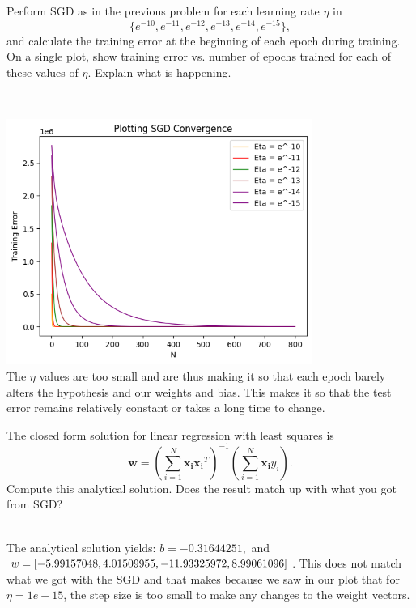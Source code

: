 \begin{problem}[2]
  Perform SGD as in the previous problem for each learning rate $\eta$ in \[\{e^{-10}, e^{-11}, e^{-12}, e^{-13}, e^{-14}, e^{-15}\},\] and calculate the training error at the beginning of each epoch during training.  On a single plot, show training error vs. number of epochs trained for each of these values of $\eta$. Explain what is happening.
\end{problem}
\begin{solution}
  \\
  \graphicspath{{images/}}
  \includegraphics[width=10cm]{Problem_3_H.png}
  \\
  The $\eta$ values are too small and are thus making it so that each epoch barely alters the hypothesis and our weights and bias. This makes it so that the test error remains relatively constant or takes a long time to change.
\end{solution}


\begin{problem}[2]
  The closed form solution for linear regression with least squares is \[\mathbf{w} = \left(\sum_{i=1}^N \mathbf{x_i}\mathbf{x_i}^T\right)^{-1}\left(\sum_{i=1}^N \mathbf{x_i}y_i\right).\]  Compute this analytical solution.  Does the result match up with what you got from SGD?
\end{problem}
\begin{solution}
  \\
 The analytical solution yields: $b = -0.31644251, $ and $w = [-5.99157048,  4.01509955, -11.93325972, \\ 8.99061096]$. This does not match what we got with the SGD and that makes because we saw in our plot that for $\eta = 1e-15$, the step size is too small to make any changes to the weight vectors.
\end{solution}

